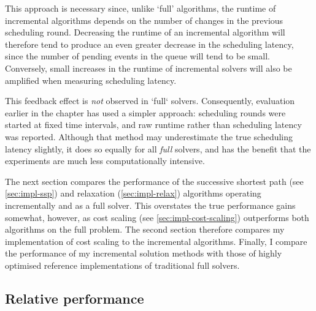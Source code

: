 This approach is necessary since, unlike `full' algorithms, the runtime of incremental algorithms depends on the number of changes in the previous scheduling round. Decreasing the runtime of an incremental algorithm will therefore tend to produce an even greater decrease in the scheduling latency, since the number of pending events in the queue will tend to be small. Conversely, small increases in the runtime of incremental solvers will also be amplified when measuring scheduling latency. 

This feedback effect is \emph{not} observed in `full` solvers. Consequently, evaluation earlier in the chapter has used a simpler approach: scheduling rounds were started at fixed time intervals, and raw runtime rather than scheduling latency was reported. Although that method may underestimate the true scheduling latency slightly\footnotemark, it does so equally for all \emph{full} solvers, and has the benefit that the experiments are much less computationally intensive.

The next section compares the performance of the successive shortest path (see \cref{sec:impl-ssp}) and relaxation (\cref{sec:impl-relax}) algorithms operating incrementally and as a full solver. This overstates the true performance gains somewhat, however, as cost scaling (see \cref{sec:impl-cost-scaling}) outperforms both algorithms on the full problem. The second section therefore compares my implementation of cost scaling to the incremental algorithms. Finally, I compare the performance of my incremental solution methods with those of highly optimised reference implementations of traditional full solvers.

\subsection{Relative performance}


